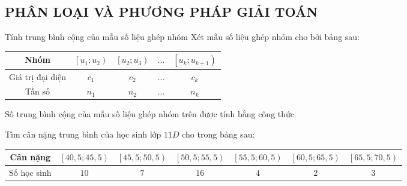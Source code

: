 \subsection{PHÂN LOẠI VÀ PHƯƠNG PHÁP GIẢI TOÁN}
\begin{dang}{Tính trung bình cộng của mẫu số liệu ghép nhóm}
	Xét mẫu số liệu ghép nhóm cho bởi bảng sau:
	\begin{center}
		\begin{tabular}{|c|c|c|c|c|}
			\hline Nhóm             & {$\left[u_1; u_2\right)$} & {$\left[u_2; u_3\right)$} & $\ldots$ & {$\left[u_k; u_{k+1}\right)$} \\
			\hline Giá trị đại diện & $c_1$                     & $c_2$                     & $\ldots$ & $c_k$                         \\
			\hline Tần số           & $n_1$                     & $n_2$                     & $\ldots$ & $n_k$                         \\
			\hline
		\end{tabular}
	\end{center}
	Số trung bình cộng của mẫu số liệu ghép nhóm trên được tính bằng công thức
\end{dang}
\begin{vd}%
	Tìm cân nặng trung bình của học sinh lớp $11D$ cho trong bảng sau:
	\begin{center}
		\begin{tabular}{|c|c|c|c|c|c|c|}
			\hline
			Cân nặng    & $\left[40{,}5;45{,}5 \right)$ & $\left[45{,}5;50{,}5 \right)$ & $\left[50{,}5;55{,}5 \right)$ & $\left[55{,}5;60{,}5 \right)$ & $\left[60{,}5;65{,}5 \right)$ & $\left[65{,}5;70{,}5 \right)$ \\
			\hline
			Số học sinh & $10$                          & $7$                           & $16$                          & $4$                           & $2$                           & $3$                           \\
			\hline
		\end{tabular}
	\end{center}
\end{vd}

